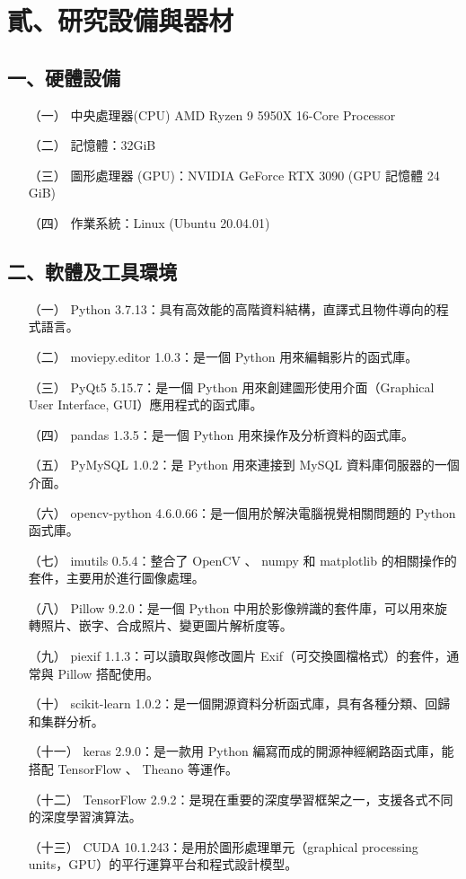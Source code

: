 \section{貳、研究設備與器材}

\subsection{一、硬體設備}

\begin{itemize}[itemindent = 2em]
    \item [（一）]中央處理器(CPU) AMD Ryzen 9 5950X 16-Core Processor
    \item [（二）]記憶體：32GiB
    \item [（三）]圖形處理器 (GPU)：NVIDIA GeForce RTX 3090 (GPU 記憶體 24 GiB)
    \item [（四）]作業系統：Linux (Ubuntu 20.04.01)
\end{itemize}

\subsection{二、軟體及工具環境}

\begin{itemize}[itemindent = 2em]
    \item [（一）]Python 3.7.13：具有高效能的高階資料結構，直譯式且物件導向的程式語言。
    \item [（二）]moviepy.editor 1.0.3：是一個 Python 用來編輯影片的函式庫。
    \item [（三）]PyQt5 5.15.7：是一個 Python 用來創建圖形使用介面（Graphical User Interface, GUI）應用程式的函式庫。
    \item [（四）]pandas 1.3.5：是一個 Python 用來操作及分析資料的函式庫。
    \item [（五）]PyMySQL 1.0.2：是 Python 用來連接到 MySQL 資料庫伺服器的一個介面。
    \item [（六）]opencv-python 4.6.0.66：是一個用於解決電腦視覺相關問題的 Python 函式庫。
    \item [（七）]imutils 0.5.4：整合了 OpenCV 、 numpy 和 matplotlib 的相關操作的套件，主要用於進行圖像處理。
    \item [（八）]Pillow 9.2.0：是一個 Python 中用於影像辨識的套件庫，可以用來旋轉照片、嵌字、合成照片、變更圖片解析度等。
    \item [（九）]piexif 1.1.3：可以讀取與修改圖片 Exif（可交換圖檔格式）的套件，通常與 Pillow 搭配使用。
    \item [（十）]scikit-learn 1.0.2：是一個開源資料分析函式庫，具有各種分類、回歸和集群分析。
    \item [（十一）]keras 2.9.0：是一款用 Python 編寫而成的開源神經網路函式庫，能搭配 TensorFlow 、 Theano 等運作。
    \item [（十二）]TensorFlow 2.9.2：是現在重要的深度學習框架之一，支援各式不同的深度學習演算法。
    \item [（十三）]CUDA 10.1.243：是用於圖形處理單元（graphical processing units，GPU）的平行運算平台和程式設計模型。
\end{itemize}

